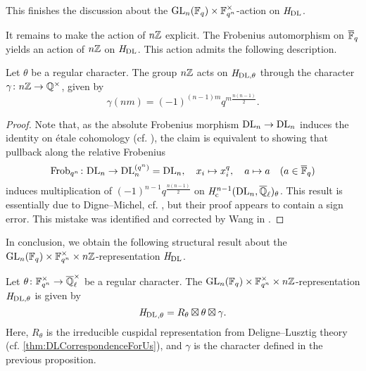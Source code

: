 \documentclass[../main.tex]{subfiles}
\begin{document}
This finishes the discussion about the $\operatorname{GL}_n(\mathbb{F}_q) \times \mathbb{F}_{q^n}^\times$-action
on $\hH_\DL$. 

It remains to make the action of $n\mathbb{Z}$ explicit. The Frobenius automorphism on
$\overline {\mathbb{F}}_q$ yields an action of $n\mathbb{Z}$ on $\hH_\DL$. This action admits the
following description.

\begin{prop}
  Let $\theta$ be a regular character. The group $n\mathbb{Z}$ acts on
  $\mathit H_{\mathrm{DL},\theta}$ through the character $\gamma\colon 
  n\mathbb{Z} \to \mathbb{Q}^\times$, given by
  $$\gamma(nm) =  (-1)^{(n-1)m} q^{m \frac{n(n-1)}2}.$$
  \begin{proof}
    Note that, as the absolute Frobenius morphism $\mathrm{DL}_n \to \mathrm{DL}_n$
    induces the identity on \'etale cohomology (cf.
    \cite[\href{https://stacks.math.columbia.edu/tag/03SN}{Tag
    03SN}]{stacks-project}), the claim is equivalent to showing that pullback 
    along the relative Frobenius 
    \begin{equation*}
      \mathrm{Frob}_{q^n}\colon  \mathrm{DL}_n \to \mathrm{DL}_n^{(q^n)} = \mathrm{DL}_n, \quad
      x_i \mapsto x_i^q,\quad a \mapsto a \quad (a \in \overline {\mathbb{F}}_q)
    \end{equation*}
    induces multiplication of $(-1)^{n-1}q^{\frac{n(n-1)}2}$
    on $\mathit H_{\mathrm{c}}^{n-1}(\mathrm{DL}_n, \overline {\mathbb{Q}}_\ell)_\theta$. 
    This result is essentially due to Digne--Michel, cf. \cite[Remarque
    3.14]{digne1985fonctions}, but their proof appears to contain a sign error.
    This mistake was identified and corrected by Wang in \cite[Théorème
    3.1.12]{wang2014espace}.
  \end{proof}
\end{prop}

In conclusion, we obtain the following structural result about the 
$\operatorname{GL}_n(\mathbb{F}_q) \times \mathbb{F}_{q^n}^\times \times n\mathbb{Z}$-representation 
$\hH_\DL$.

\begin{thm}[Structure of $\hH_\DL$]\label{thm:MainThmHDlStructure}
  Let $\theta\colon  \mathbb{F}_{q^n}^\times \to \overline {\mathbb{Q}}_\ell^\times$ be a regular character.  
  The $\operatorname{GL}_n(\mathbb{F}_q) \times \mathbb{F}_{q^n}^\times \times n\mathbb{Z}$-representation
  $\mathit H_{\mathrm{DL}, \theta}$ is given by 
  \begin{equation*}
    {\mathit H_\mathrm{DL}}_{,\theta} = R_\theta \boxtimes \theta \boxtimes \gamma.
  \end{equation*}
  Here, $R_\theta$ is the irreducible cuspidal representation from
  Deligne--Lusztig theory (cf. \cref{thm:DLCorrespondenceForUs}), and $\gamma$ is the character defined in the previous proposition.
\end{thm}
\end{document}
